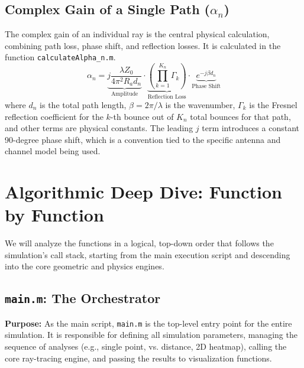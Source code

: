 \documentclass{article}
\begin{document}
	\subsection{Complex Gain of a Single Path ($\alpha_n$)}
	The complex gain of an individual ray is the central physical calculation, combining path loss, phase shift, and reflection losses. It is calculated in the function \texttt{calculateAlpha\_n.m}.
	\begin{equation}
		\alpha_n = \underbrace{j \frac{\lambda Z_0}{4 \pi^2 R_a d_n}}_{\text{Amplitude}} \cdot \underbrace{\left( \prod_{k=1}^{K_n} \Gamma_k \right)}_{\text{Reflection Loss}} \cdot \underbrace{e^{-j \beta d_n}}_{\text{Phase Shift}}
		\label{eq:alpha_n_annotated}
	\end{equation}
	where $d_n$ is the total path length, $\beta=2\pi/\lambda$ is the wavenumber, $\Gamma_k$ is the Fresnel reflection coefficient for the $k$-th bounce out of $K_n$ total bounces for that path, and other terms are physical constants. The leading $j$ term introduces a constant 90-degree phase shift, which is a convention tied to the specific antenna and channel model being used.
	
	\section{Algorithmic Deep Dive: Function by Function}
	We will analyze the functions in a logical, top-down order that follows the simulation's call stack, starting from the main execution script and descending into the core geometric and physics engines.
	
	\subsection{\texttt{main.m}: The Orchestrator}
	\textbf{Purpose:} As the main script, \texttt{main.m} is the top-level entry point for the entire simulation. It is responsible for defining all simulation parameters, managing the sequence of analyses (e.g., single point, vs. distance, 2D heatmap), calling the core ray-tracing engine, and passing the results to visualization functions.
	
\end{document}
